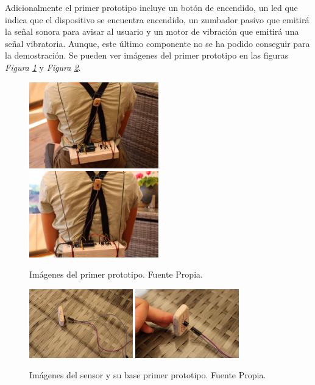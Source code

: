 Adicionalmente el primer prototipo incluye un botón de encendido, un led que indica que el dispositivo se encuentra encendido, un zumbador pasivo que emitirá la señal sonora para avisar al usuario y un motor de vibración que emitirá una señal vibratoria. Aunque, este último componente no se ha podido conseguir para la demostración. Se pueden ver imágenes del primer prototipo en las figuras \textit{Figura \ref{fig:imgDispositivo_V1}} y \textit{Figura \ref{fig:imgDispositivo_V1_sensor}}.

\begin{figure}[h!]
    \centering
    \includegraphics[width=0.5\textwidth]{img/Disp_V1_1.jpg}
    \includegraphics[width=0.5\textwidth]{img/Disp_V1_2.jpg}
    \caption{Imágenes del primer prototipo. Fuente Propia.}
    \label{fig:imgDispositivo_V1} 
\end{figure}

\begin{figure}[h!]
    \centering
    \includegraphics[width=0.4\textwidth]{img/SensorV1_1.jpg}
    \includegraphics[width=0.4\textwidth]{img/SensorV1_2.jpg}
    \caption{Imágenes del sensor y su base  primer prototipo. Fuente Propia.}
    \label{fig:imgDispositivo_V1_sensor} 
\end{figure}

